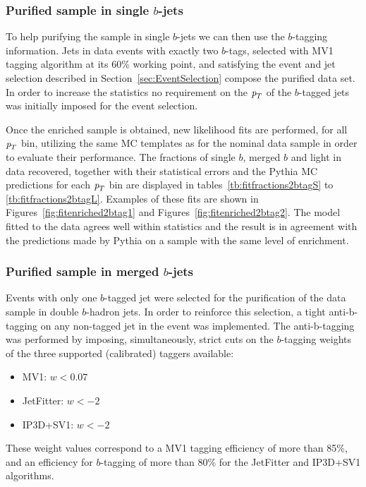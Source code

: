 \subsubsection{Purified sample in single $b$-jets}

To help purifying the sample in single $b$-jets we can then use the $b$-tagging information. Jets in data events with exactly two $b$-tags, selected with MV1 tagging algorithm at its 60\% working point, and satisfying the event and jet selection described in Section~\ref{sec:EventSelection} compose the purified data set.  In order to increase the statistics no requirement on the ${\emph{p}_{T}}$ of the $b$-tagged jets was initially imposed for the event selection. 

Once the enriched sample is obtained, new likelihood fits are performed, for all ${\emph{p}_{T}}$ bin, utilizing the same MC templates as for the nominal data sample in order to evaluate their performance.  
The fractions of single $b$, merged $b$ and light in data recovered, together with their statistical errors and the {\sc Pythia} MC predictions for each ${\emph{p}_{T}}$ bin are displayed in tables~\ref{tb:fitfractions2btagS} to \ref{tb:fitfractions2btagL}.   Examples of these fits are shown  in  Figures~\ref{fig:fitenriched2btag1} and Figures~\ref{fig:fitenriched2btag2}.  The model fitted to the data agrees well within statistics and the result is in agreement with the predictions made by {\sc Pythia} on a sample with the same level of enrichment.  

\subsubsection{Purified sample in merged $b$-jets}

Events with only one $b$-tagged jet were selected for the purification of the data sample in double $b$-hadron jets.  In order to reinforce this selection, a tight anti-b-tagging on any non-tagged jet in the event was implemented.  The anti-b-tagging was performed by imposing, simultaneously, strict cuts on the $b$-tagging weights of the three supported (calibrated) taggers available:
%
\begin{itemize}
\item
MV1:  $w < 0.07$  
\item
JetFitter:  $w < -2$
\item
IP3D+SV1:  $w < -2$
\end{itemize}
%
These weight values correspond to a MV1 tagging efficiency of more than 85\%, and an efficiency for $b$-tagging of more than 80\% for the JetFitter and IP3D+SV1 algorithms. 

